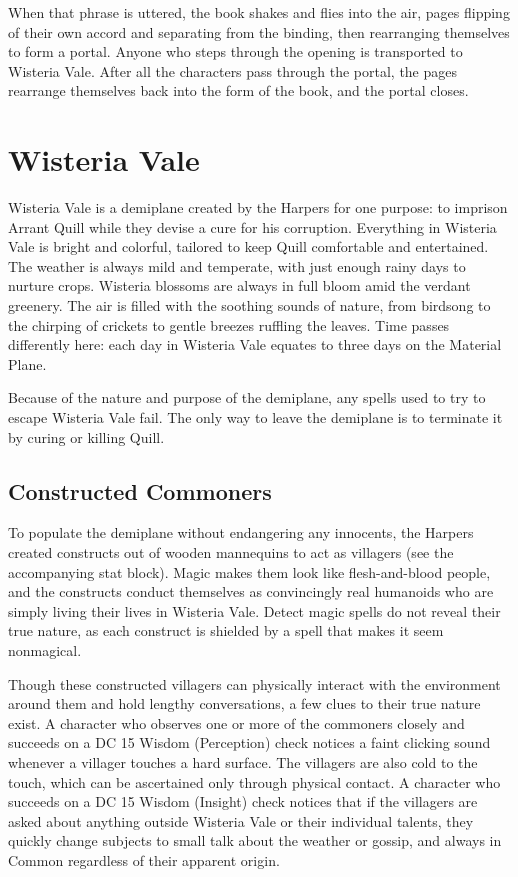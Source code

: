 \documentclass[10pt,a4paper,twoside,bg=print,twocolumn,openany,nodeprecatedcode]{dndbook}
\begin{document}
When that phrase is uttered, the book shakes and flies into the air, pages flipping of their own accord and separating from the binding, then rearranging themselves to form a portal. Anyone who steps through the opening is transported to Wisteria Vale. After all the characters pass through the portal, the pages rearrange themselves back into the form of the book, and the portal closes.

\section{Wisteria Vale}
Wisteria Vale is a demiplane created by the Harpers for one purpose: to imprison Arrant Quill while they devise a cure for his corruption. Everything in Wisteria Vale is bright and colorful, tailored to keep Quill comfortable and entertained. The weather is always mild and temperate, with just enough rainy days to nurture crops. Wisteria blossoms are always in full bloom amid the verdant greenery. The air is filled with the soothing sounds of nature, from birdsong to the chirping of crickets to gentle breezes ruffling the leaves. Time passes differently here: each day in Wisteria Vale equates to three days on the Material Plane.

Because of the nature and purpose of the demiplane, any spells used to try to escape Wisteria Vale fail. The only way to leave the demiplane is to terminate it by curing or killing Quill.

\subsection{Constructed Commoners}
To populate the demiplane without endangering any innocents, the Harpers created constructs out of wooden mannequins to act as villagers (see the accompanying stat block). Magic makes them look like flesh-and-blood people, and the constructs conduct themselves as convincingly real humanoids who are simply living their lives in Wisteria Vale. Detect magic spells do not reveal their true nature, as each construct is shielded by a spell that makes it seem nonmagical.

Though these constructed villagers can physically interact with the environment around them and hold lengthy conversations, a few clues to their true nature exist. A character who observes one or more of the commoners closely and succeeds on a DC 15 Wisdom (Perception) check notices a faint clicking sound whenever a villager touches a hard surface. The villagers are also cold to the touch, which can be ascertained only through physical contact. A character who succeeds on a DC 15 Wisdom (Insight) check notices that if the villagers are asked about anything outside Wisteria Vale or their individual talents, they quickly change subjects to small talk about the weather or gossip, and always in Common regardless of their apparent origin.
\end{document}
